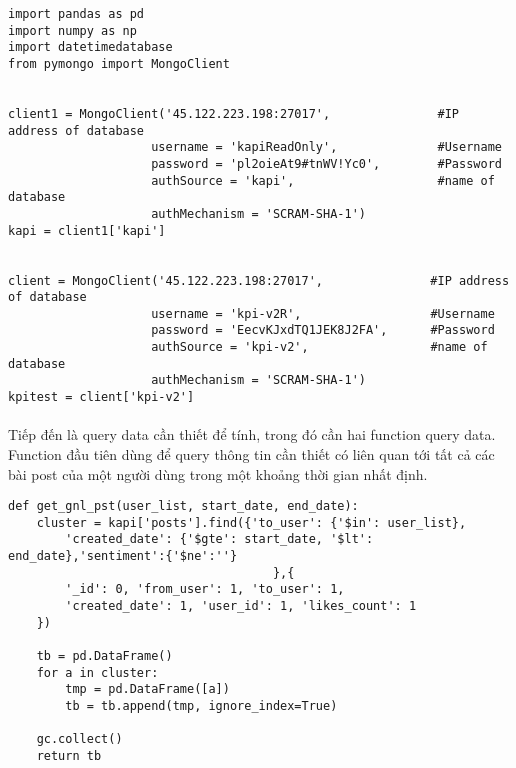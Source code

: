 \documentclass[12pt]{article}
\numberwithin{equation}{section}
\begin{document}
\begin{lstlisting}
import pandas as pd
import numpy as np
import datetimedatabase
from pymongo import MongoClient


client1 = MongoClient('45.122.223.198:27017',               #IP address of database
                    username = 'kapiReadOnly',              #Username
                    password = 'pl2oieAt9#tnWV!Yc0',        #Password
                    authSource = 'kapi',                    #name of database
                    authMechanism = 'SCRAM-SHA-1')
kapi = client1['kapi']


client = MongoClient('45.122.223.198:27017',               #IP address of database
                    username = 'kpi-v2R',                  #Username
                    password = 'EecvKJxdTQ1JEK8J2FA',      #Password
                    authSource = 'kpi-v2',                 #name of database
                    authMechanism = 'SCRAM-SHA-1')
kpitest = client['kpi-v2']

\end{lstlisting}

\paragraph{} Tiếp đến là query data cần thiết để tính, trong đó cần hai function query data. Function đầu tiên dùng để query thông tin cần thiết có liên quan tới tất cả các bài post của một người dùng trong một khoảng thời gian nhất định.

\begin{lstlisting}
def get_gnl_pst(user_list, start_date, end_date):
    cluster = kapi['posts'].find({'to_user': {'$in': user_list},
        'created_date': {'$gte': start_date, '$lt': end_date},'sentiment':{'$ne':''}
                                     },{
        '_id': 0, 'from_user': 1, 'to_user': 1,
        'created_date': 1, 'user_id': 1, 'likes_count': 1
    })

    tb = pd.DataFrame()
    for a in cluster:
        tmp = pd.DataFrame([a])
        tb = tb.append(tmp, ignore_index=True)

    gc.collect()
    return tb
\end{lstlisting}
\end{document}
